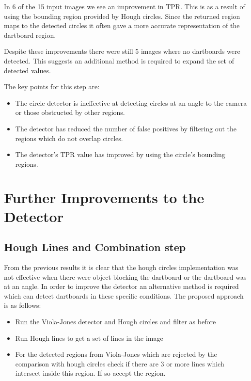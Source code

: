 \documentclass{article}
\begin{document}
\begin{multicols}{2}
In 6 of the 15 input images we see an improvement in TPR. This is as a
result of using the bounding region provided by Hough circles. Since the returned 
region maps to the detected circles it often gave a more accurate
representation of the dartboard region. 

Despite these improvements there were still 5 images where no dartboards were
detected. This suggests an additional method is required to expand the set of
detected values.

The key points for this step are:

\begin{itemize}
  \item The circle detector is ineffective at detecting circles at an angle to the camera or those obstructed by other regions.
  \item The detector has reduced the number of false positives by filtering out the regions which do not overlap circles.
  \item The detector's TPR value has improved by using the circle's bounding regions.
\end{itemize} 


\section{Further Improvements to the Detector}

\subsection{Hough Lines and Combination step}

From the previous results it is clear that the hough circles implementation was
not effective when there were object blocking the dartboard or the dartboard was
at an angle. In order to improve the detector an alternative method is required
which can detect dartboards in these specific conditions. The
proposed approach is as follows:

\begin{itemize}
  \item Run the Viola-Jones detector and Hough circles and filter as before 
  \item Run Hough lines to get a set of lines in the image
  \item For the detected regions from Viola-Jones which are rejected by the
    comparison with hough circles check if there are 3 or more lines which
    intersect inside this region. If so accept the region.
\end{itemize} 


\end{multicols}
\end{document}
